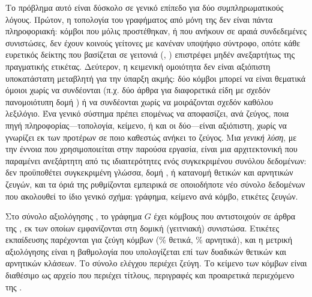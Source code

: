 Το πρόβλημα αυτό είναι δύσκολο σε γενικό επίπεδο για δύο συμπληρωματικούς λόγους.
Πρώτον, η τοπολογία του γραφήματος από μόνη της δεν είναι πάντα πληροφοριακή: κόμβοι
που μόλις προστέθηκαν, ή που ανήκουν σε αραιά συνδεδεμένες συνιστώσες, δεν έχουν
κοινούς γείτονες με κανέναν υποψήφιο σύντροφο, οπότε κάθε ευρετικός δείκτης που
βασίζεται σε γειτονιά (, ) επιστρέφει μηδέν
ανεξαρτήτως της πραγματικής ετικέτας.
Δεύτερον, η κειμενική ομοιότητα δεν είναι
αξιόπιστη υποκατάστατη μεταβλητή για την ύπαρξη ακμής: δύο κόμβοι μπορεί να είναι
θεματικά όμοιοι χωρίς να συνδέονται (π.χ. δύο άρθρα για διαφορετικά είδη με σχεδόν
πανομοιότυπη δομή ) ή να συνδέονται χωρίς να μοιράζονται σχεδόν καθόλου
λεξιλόγιο.
Ένα γενικό σύστημα πρέπει επομένως να αποφασίζει, ανά ζεύγος, ποια πηγή
πληροφορίας---τοπολογία, κείμενο, ή και οι δύο---είναι αξιόπιστη, χωρίς να γνωρίζει
εκ των προτέρων σε ποιο καθεστώς ανήκει το ζεύγος.
Μια \textit{γενική λύση}, με την
έννοια που χρησιμοποιείται στην παρούσα εργασία, είναι μια αρχιτεκτονική που
παραμένει ανεξάρτητη από τις ιδιαιτερότητες ενός συγκεκριμένου συνόλου δεδομένων:
δεν προϋποθέτει συγκεκριμένη γλώσσα, δομή , ή κατανομή θετικών και
αρνητικών ζευγών, και τα όριά της ρυθμίζονται εμπειρικά σε οποιοδήποτε νέο σύνολο
δεδομένων που ακολουθεί το ίδιο γενικό σχήμα: γράφημα, κείμενο ανά κόμβο, ετικέτες
ζευγών.

Στο σύνολο αξιολόγησης  \cite{phan2023link}, το γράφημα $G$
έχει \GraphNodesTotal{} κόμβους που αντιστοιχούν σε άρθρα της , εκ των οποίων
\GraphNodes{} εμφανίζονται στη δομική (γειτνιακή) συνιστώσα.
Ετικέτες εκπαίδευσης
παρέχονται για \TrainPairs{} ζεύγη κόμβων (\TrainPosPct\% θετικά, \TrainNegPct\% αρνητικά), και η μετρική
αξιολόγησης είναι η βαθμολογία  που υπολογίζεται επί των δυαδικών
θετικών και αρνητικών κλάσεων.
Το σύνολο ελέγχου περιέχει \TestPairs{} ζεύγη.
Το κείμενο
των κόμβων είναι διαθέσιμο ως αρχείο \texttt{} που περιέχει τίτλους,
περιγραφές και προαιρετικά περιεχόμενο  της .

